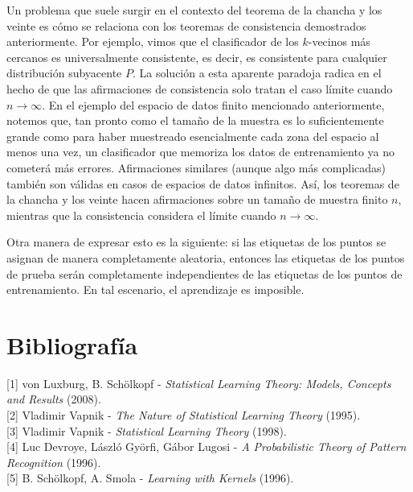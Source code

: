 \documentclass{report}
\begin{document}
Un problema que suele surgir en el contexto del teorema de la chancha y los veinte es cómo se relaciona con los 
teoremas de consistencia demostrados anteriormente. Por ejemplo, vimos que el clasificador 
de los \(k\)-vecinos más cercanos es universalmente consistente, es decir, es consistente para cualquier 
distribución subyacente \(P\). La solución a esta aparente paradoja radica en el hecho de que las afirmaciones de consistencia solo tratan 
el caso límite cuando \(n \to \infty\). En el ejemplo del espacio de datos finito mencionado anteriormente, 
notemos que, tan pronto como el tamaño de la muestra es lo suficientemente grande como para haber muestreado 
esencialmente cada zona del espacio al menos una vez, un clasificador que memoriza los datos de entrenamiento 
ya no cometerá más errores. Afirmaciones similares (aunque algo más complicadas) también son válidas en casos 
de espacios de datos infinitos. Así, los teoremas de la chancha y los veinte hacen afirmaciones sobre un tamaño de muestra finito \(n\), mientras que 
la consistencia considera el límite cuando \(n \to \infty\).\newline

Otra manera de expresar esto es la siguiente: si las etiquetas de los puntos se asignan de manera 
completamente aleatoria, entonces las etiquetas de los puntos de prueba serán completamente independientes 
de las etiquetas de los puntos de entrenamiento. En tal escenario, el aprendizaje es imposible.\newline

\bigbreak
\pagebreak
\chapter*{Bibliografía}

[1] von Luxburg, B. Schölkopf - \textit{Statistical Learning Theory: Models, Concepts and Results} (2008). \\

[2] Vladimir Vapnik - \textit{The Nature of Statistical Learning Theory} (1995). \\

[3] Vladimir Vapnik  - \textit{Statistical Learning Theory} (1998). \\

[4] Luc Devroye, László Györfi, Gábor Lugosi - \textit{A Probabilistic Theory of Pattern Recognition} (1996). \\

[5] B. Schölkopf, A. Smola - \textit{Learning with Kernels} (1996). \\
\end{document}
